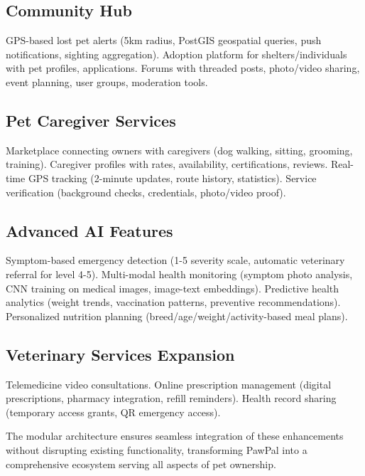 \subsection{Community Hub}

GPS-based lost pet alerts (5km radius, PostGIS geospatial queries, push notifications, sighting aggregation). Adoption platform for shelters/individuals with pet profiles, applications. Forums with threaded posts, photo/video sharing, event planning, user groups, moderation tools.

\subsection{Pet Caregiver Services}

Marketplace connecting owners with caregivers (dog walking, sitting, grooming, training). Caregiver profiles with rates, availability, certifications, reviews. Real-time GPS tracking (2-minute updates, route history, statistics). Service verification (background checks, credentials, photo/video proof).

\subsection{Advanced AI Features}

Symptom-based emergency detection (1-5 severity scale, automatic veterinary referral for level 4-5). Multi-modal health monitoring (symptom photo analysis, CNN training on medical images, image-text embeddings). Predictive health analytics (weight trends, vaccination patterns, preventive recommendations). Personalized nutrition planning (breed/age/weight/activity-based meal plans).

\subsection{Veterinary Services Expansion}

Telemedicine video consultations. Online prescription management (digital prescriptions, pharmacy integration, refill reminders). Health record sharing (temporary access grants, QR emergency access).


The modular architecture ensures seamless integration of these enhancements without disrupting existing functionality, transforming PawPal into a comprehensive ecosystem serving all aspects of pet ownership.
